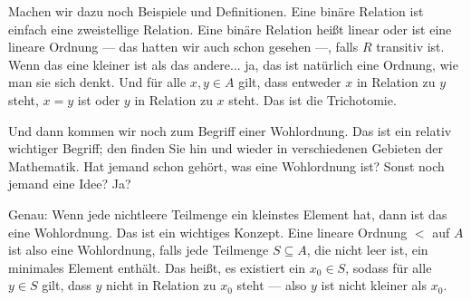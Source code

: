 \begin{math-stroke}

\end{math-stroke}

\begin{spoken-clean}[01:14:35 - 01:16:01]
Machen wir dazu noch Beispiele und Definitionen. Eine binäre Relation ist einfach eine zweistellige Relation. Eine binäre Relation heißt linear oder ist eine lineare Ordnung --- das hatten wir auch schon gesehen ---, falls $R$ transitiv ist. Wenn das eine kleiner ist als das andere... ja, das ist natürlich eine Ordnung, wie man sie sich denkt. Und für alle $x, y \in A$ gilt, dass entweder $x$ in Relation zu $y$ steht, $x = y$ ist oder $y$ in Relation zu $x$ steht. Das ist die Trichotomie.

Und dann kommen wir noch zum Begriff einer Wohlordnung. Das ist ein relativ wichtiger Begriff; den finden Sie hin und wieder in verschiedenen Gebieten der Mathematik. Hat jemand schon gehört, was eine Wohlordnung ist? Sonst noch jemand eine Idee? Ja?
\end{spoken-clean}

\begin{spoken-clean}[01:16:01 - 01:17:57]
Genau: Wenn jede nichtleere Teilmenge ein kleinstes Element hat, dann ist das eine Wohlordnung. Das ist ein wichtiges Konzept. Eine lineare Ordnung $<$ auf $A$ ist also eine Wohlordnung, falls jede Teilmenge $S \subseteq A$, die nicht leer ist, ein minimales Element enthält. Das heißt, es existiert ein $x_0 \in S$, sodass für alle $y \in S$ gilt, dass $y$ nicht in Relation zu $x_0$ steht --- also $y$ ist nicht kleiner als $x_0$.
\end{spoken-clean}

